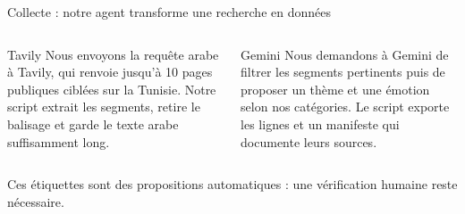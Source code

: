 \documentclass[aspectratio=169,10pt]{beamer}
\begin{document}
\begin{frame}{Collecte : notre agent transforme une recherche en données}
\centering
{}
\vspace{.65cm}
\begin{columns}[T,onlytextwidth]
\begin{block}{Tavily}
Nous envoyons la requête arabe à Tavily, qui renvoie jusqu'à 10 pages publiques ciblées sur la Tunisie. Notre script extrait les segments, retire le balisage et garde le texte arabe suffisamment long.
\end{block}
\begin{block}{Gemini}
Nous demandons à Gemini de filtrer les segments pertinents puis de proposer un thème et une émotion selon nos catégories. Le script exporte les lignes et un manifeste qui documente leurs sources.
\end{block}
\end{columns}
\vspace{.12cm}\small Ces étiquettes sont des propositions automatiques : une vérification humaine reste nécessaire.
\end{frame}
\end{document}
